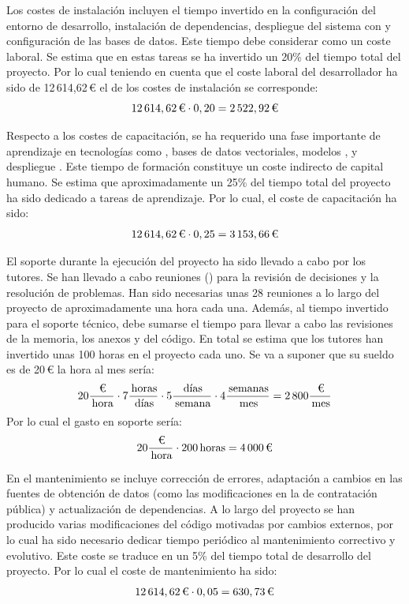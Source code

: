 Los costes de instalación incluyen el tiempo invertido en la configuración del entorno de desarrollo, instalación de dependencias, despliegue del sistema con  y configuración de las bases de datos. Este tiempo debe considerar como un coste laboral. Se estima que en estas tareas se ha invertido un 20\% del tiempo total del proyecto. Por lo cual teniendo en cuenta que el coste laboral del desarrollador ha sido de 12\,614,62\,€ el de los costes de instalación se corresponde:
$$
12\,614,62\,\text{\texteuro} \cdot 0,20
= 2\,522,92\,\text{\texteuro}
$$

Respecto a los costes de capacitación, se ha requerido una fase importante de aprendizaje en tecnologías como , bases de datos vectoriales, modelos ,  y despliegue . Este tiempo de formación constituye un coste indirecto de capital humano. Se estima que aproximadamente un 25\% del tiempo total del proyecto ha sido dedicado a tareas de aprendizaje. Por lo cual, el coste de capacitación ha sido:
$$
12\,614,62\,\text{\texteuro} \cdot 0,25
= 3\,153,66\,\text{\texteuro}
$$

El soporte durante la ejecución del proyecto ha sido llevado a cabo por los tutores. Se han llevado a cabo reuniones () para la revisión de decisiones y la resolución de problemas. Han sido necesarias unas 28 reuniones a lo largo del proyecto de aproximadamente una hora cada una. Además, al tiempo invertido para el soporte técnico, debe sumarse el tiempo para llevar a cabo las revisiones de la memoria, los anexos y del código. En total se estima que los tutores han invertido unas 100 horas en el proyecto cada uno. Se va a suponer que su sueldo es de 20\,€ la hora al mes sería:
$$ 
20\frac{\,\text{\texteuro}}{\,\text{hora}} \cdot 7\frac{\,\text{horas}}{\,\text{días}} \cdot 5\frac{\,\text{días}}{\,\text{semana}} \cdot 4\frac{\,\text{semanas}}{\,\text{mes}} 
= 2\,800\frac{\,\text{\texteuro}}{\,\text{mes}}
$$
Por lo cual el gasto en soporte sería:
$$ 
20\frac{\,\text{\texteuro}}{\,\text{hora}} \cdot 200\,\text{horas}
= 4\,000\,\text{\texteuro}
$$

En el mantenimiento se incluye corrección de errores, adaptación a cambios en las fuentes de obtención de datos (como las modificaciones en la  de contratación pública) y actualización de dependencias. A lo largo del proyecto se han producido varias modificaciones del código motivadas por cambios externos, por lo cual ha sido necesario dedicar tiempo periódico al mantenimiento correctivo y evolutivo. Este coste se traduce en un 5\% del tiempo total de desarrollo del proyecto. Por lo cual el coste de mantenimiento ha sido:
$$
12\,614,62\,\text{\texteuro} \cdot 0,05
= 630,73\,\text{\texteuro}
$$

